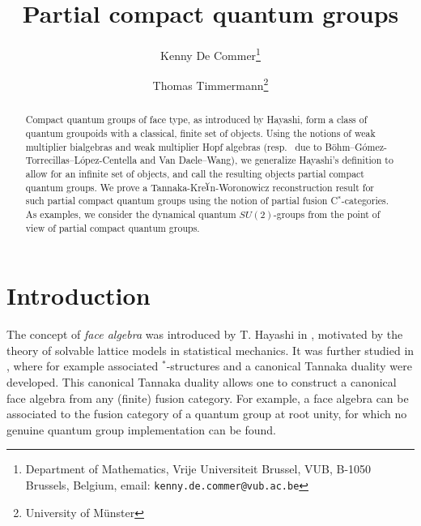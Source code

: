 \documentclass[10pt]{article}
\date{}
\theoremstyle{definition}
\numberwithin{equation}{section}
\begin{document}
\title{Partial compact quantum groups}

\author{Kenny De Commer\thanks{Department of Mathematics, Vrije Universiteit Brussel, VUB, B-1050 Brussels, Belgium, email: {\tt kenny.de.commer@vub.ac.be}}
\and Thomas Timmermann\thanks{University of M\"{u}nster}}

\maketitle

\begin{abstract}
\noindent Compact quantum groups of face type, as introduced by
Hayashi, form a class of quantum groupoids with a classical, finite
set of objects. Using the notions of  weak multiplier bialgebras and
weak multiplier Hopf algebras (resp.~ due to
B{\"o}hm--G\'{o}mez-Torrecillas--L\'{o}pez-Centella and Van
Daele--Wang), we generalize Hayashi's definition to allow for an
infinite set of objects, and call the resulting objects partial
compact quantum groups. We prove a
Tannaka-Kre$\breve{\textrm{\i}}$n-Woronowicz reconstruction result for
such partial compact quantum groups using the notion of  partial fusion C$^*$-categories. As examples, we consider the dynamical quantum $SU(2)$-groups from the point of view of partial compact quantum groups.
\end{abstract}









\section*{Introduction}

The concept of \emph{face algebra} was introduced by T. Hayashi in \cite{Hay2}, motivated by the theory of solvable lattice models in statistical mechanics. It was further studied in \cite{Hay1,Hay3,Hay4,Hay5,Hay6,Hay7,Hay8}, where for example associated $^*$-structures and a canonical Tannaka duality were developed. This canonical Tannaka duality allows one to construct a canonical face algebra from any (finite) fusion category. For example, a face algebra can be associated to the fusion category of a quantum group at root unity, for which no genuine quantum group implementation can be found. 
\end{document}
